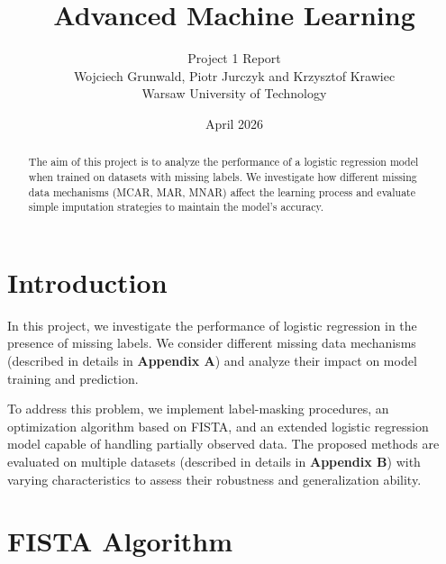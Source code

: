 \documentclass[12pt,a4paper]{article}
\title{Advanced Machine Learning}
\author{
Project 1 Report\\[1em]
Wojciech Grunwald, Piotr Jurczyk and Krzysztof Krawiec\\
Warsaw University of Technology
}
\date{April 2026}
\begin{document}
\maketitle


\begin{abstract}
\noindent The aim of this project is to analyze the performance of a logistic regression model when trained on datasets with missing labels. We investigate how different missing data mechanisms (MCAR, MAR, MNAR) affect the learning process and evaluate simple imputation strategies to maintain the model's accuracy.
\end{abstract}


{\footnotesize
\tableofcontents
}
\clearpage

\section{Introduction}

In this project, we investigate the performance of logistic regression in the presence of missing labels. We consider different missing data mechanisms (described in details in \textbf{Appendix A}) and analyze their impact on model training and prediction.

To address this problem, we implement label-masking procedures, an optimization algorithm based on FISTA, and an extended logistic regression model capable of handling partially observed data. The proposed methods are evaluated on multiple datasets (described in details in \textbf{Appendix B}) with varying characteristics to assess their robustness and generalization ability.


\section{FISTA Algorithm}
\end{document}
